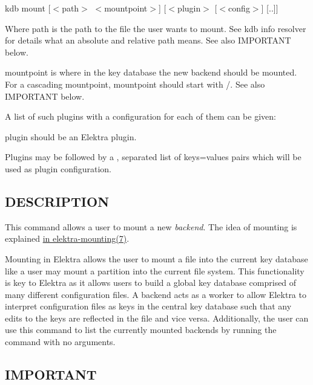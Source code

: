 {\ttfamily kdb mount \mbox{[}$<$path$>$ $<$mountpoint$>$\mbox{]} \mbox{[}$<$plugin$>$ \mbox{[}$<$config$>$\mbox{]} \mbox{[}..\mbox{]}\mbox{]}}~\newline



\begin{DoxyItemize}
\item Where {\ttfamily path} is the path to the file the user wants to mount. See {\ttfamily kdb info resolver} for details what an absolute and relative path means. See also I\+M\+P\+O\+R\+T\+A\+NT below.
\item {\ttfamily mountpoint} is where in the key database the new backend should be mounted. For a cascading mountpoint, {\ttfamily mountpoint} should start with {\ttfamily /}. See also I\+M\+P\+O\+R\+T\+A\+NT below.
\item A list of such plugins with a configuration for each of them can be given\+:
\begin{DoxyItemize}
\item {\ttfamily plugin} should be an Elektra plugin.
\item Plugins may be followed by a {\ttfamily ,} separated list of {\ttfamily keys=values} pairs which will be used as plugin configuration.
\end{DoxyItemize}
\end{DoxyItemize}

\subsection*{D\+E\+S\+C\+R\+I\+P\+T\+I\+ON}

This command allows a user to mount a new {\itshape backend}. The idea of mounting is explained \hyperlink{md_doc_help_elektra-mounting_doc_help_elektra-mounting_md}{in elektra-\/mounting(7)}.

Mounting in Elektra allows the user to mount a file into the current key database like a user may mount a partition into the current file system. This functionality is key to Elektra as it allows users to build a global key database comprised of many different configuration files. A backend acts as a worker to allow Elektra to interpret configuration files as keys in the central key database such that any edits to the keys are reflected in the file and vice versa. Additionally, the user can use this command to list the currently mounted backends by running the command with no arguments.

\subsection*{I\+M\+P\+O\+R\+T\+A\+NT}

